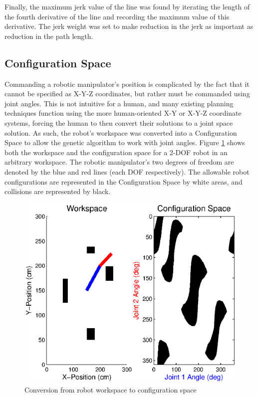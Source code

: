 Finally, the maximum jerk value of the line was found by iterating the length of the fourth derivative of the line and recording the maximum value of this derivative. The jerk weight was set to make reduction in the jerk as important as reduction in the path length.

\subsection{Configuration Space}
Commanding a robotic manipulator's position is complicated by the fact that it cannot be specified as X-Y-Z coordinates, but rather must be commanded using joint angles. This is not intuitive for a human, and many existing planning techniques function using the more human-oriented X-Y or X-Y-Z coordinate systems, forcing the human to then convert their solutions to a joint space solution. As such, the robot's workspace was converted into a Configuration Space to allow the genetic algorithm to work with joint angles. Figure \ref{fig:ws2cs} shows both the workspace and the configuration space for a 2-DOF robot in an arbitrary workspace. The robotic manipulator's two degrees of freedom are denoted by the blue and red lines (each DOF respectively). The allowable robot configurations are represented in the Configuration Space by white areas, and collisions are represented by black.

\begin{figure}[h]
	\centering
	\includegraphics[width=\figWidth]{./figures/wp2cs.eps}
	\caption{Conversion from robot workspace to configuration space }
	\label{fig:ws2cs}
\end{figure}

